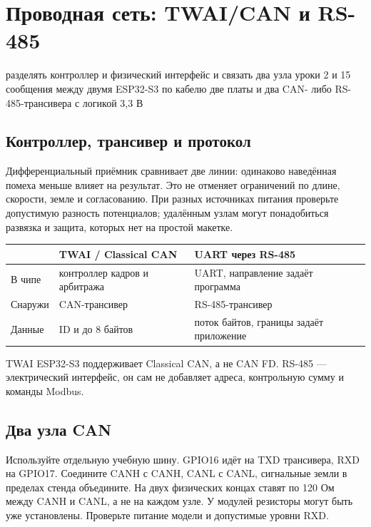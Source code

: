 \section{Проводная сеть: TWAI/CAN и RS-485}\label{les:wired-buses}
\lessonintro
  {разделять контроллер и физический интерфейс и связать два узла}
  {уроки 2 и 15}
  {сообщения между двумя ESP32-S3 по кабелю}
  {две платы и два CAN- либо RS-485-трансивера с логикой 3,3 В}

\subsection{Контроллер, трансивер и протокол}
Дифференциальный приёмник сравнивает две линии: одинаково наведённая помеха меньше влияет
на результат. Это не отменяет ограничений по длине, скорости, земле и согласованию.
При разных источниках питания проверьте допустимую разность потенциалов; удалённым узлам
могут понадобиться развязка и защита, которых нет на простой макетке.

\begin{center}\small
\begin{tabularx}{\textwidth}{@{}l X X@{}}\toprule
 & TWAI / Classical CAN & UART через RS-485\\\midrule
В чипе & контроллер кадров и арбитража & UART, направление задаёт программа\\
Снаружи & CAN-трансивер & RS-485-трансивер\\
Данные & ID и до 8 байтов & поток байтов, границы задаёт приложение\\
\bottomrule\end{tabularx}\end{center}
TWAI ESP32-S3 поддерживает Classical CAN, а не CAN FD. RS-485 --- электрический интерфейс,
он сам не добавляет адреса, контрольную сумму и команды Modbus.

\subsection{Два узла CAN}
Используйте отдельную учебную шину. GPIO16 идёт на TXD трансивера, RXD на GPIO17.
Соедините CANH с CANH, CANL с CANL, сигнальные земли в пределах стенда объедините.
На двух физических концах ставят по 120 Ом между CANH и CANL, а не на каждом узле.
У модулей резисторы могут быть уже установлены. Проверьте питание модели и допустимые уровни RXD.

